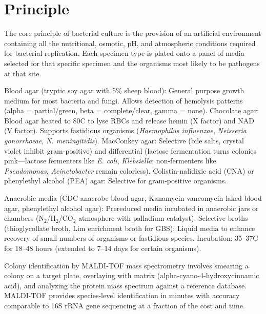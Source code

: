 \section*{Principle}
The core principle of bacterial culture is the provision of an artificial environment containing all the nutritional, osmotic, pH, and atmospheric conditions required for bacterial replication. Each specimen type is plated onto a panel of media selected for that specific specimen and the organisms most likely to be pathogens at that site.

Blood agar (tryptic soy agar with 5\% sheep blood): General purpose growth medium for most bacteria and fungi. Allows detection of hemolysis patterns (alpha = partial/green, beta = complete/clear, gamma = none). Chocolate agar: Blood agar heated to 80\textdegree{}C to lyse RBCs and release hemin (X factor) and NAD (V factor). Supports fastidious organisms (\textit{Haemophilus influenzae}, \textit{Neisseria gonorrhoeae}, \textit{N. meningitidis}). MacConkey agar: Selective (bile salts, crystal violet inhibit gram-positive) and differential (lactose fermentation turns colonies pink---lactose fermenters like \textit{E. coli}, \textit{Klebsiella}; non-fermenters like \textit{Pseudomonas}, \textit{Acinetobacter} remain colorless). Colistin-nalidixic acid (CNA) or phenylethyl alcohol (PEA) agar: Selective for gram-positive organisms.

Anaerobic media (CDC anaerobe blood agar, Kanamycin-vancomycin laked blood agar, phenylethyl alcohol agar): Prereduced media incubated in anaerobic jars or chambers (N$_2$/H$_2$/CO$_2$ atmosphere with palladium catalyst). Selective broths (thioglycollate broth, Lim enrichment broth for GBS): Liquid media to enhance recovery of small numbers of organisms or fastidious species. Incubation: 35--37\textdegree{}C for 18--48 hours (extended to 7--14 days for certain organisms).

Colony identification by MALDI-TOF mass spectrometry involves smearing a colony on a target plate, overlaying with matrix (alpha-cyano-4-hydroxycinnamic acid), and analyzing the protein mass spectrum against a reference database. MALDI-TOF provides species-level identification in minutes with accuracy comparable to 16S rRNA gene sequencing at a fraction of the cost and time.

